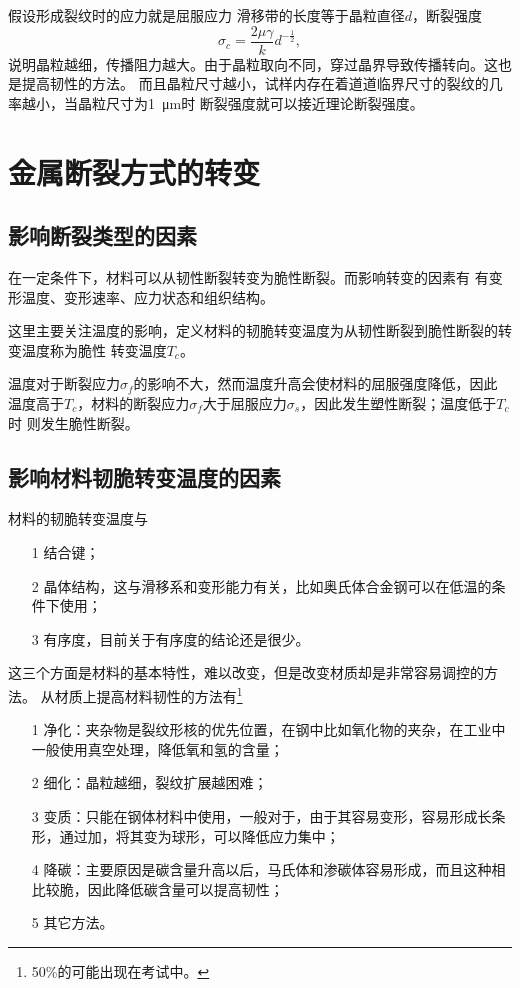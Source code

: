            假设形成裂纹时的应力就是屈服应力 滑移带的长度等于晶粒直径$d$，断裂强度
            \begin{equation}
                \sigma_c=\frac{2\mu\gamma}{k} d^{-\frac{1}{2}},
            \end{equation}
            说明晶粒越细，传播阻力越大。由于晶粒取向不同，穿过晶界导致传播转向。这也是提高韧性的方法。
            而且晶粒尺寸越小，试样内存在着道道临界尺寸的裂纹的几率越小，当晶粒尺寸为\SI{1}{\micro\m}时
            断裂强度就可以接近理论断裂强度。
    \section{金属断裂方式的转变}
        \subsection{影响断裂类型的因素}
            在一定条件下，材料可以从韧性断裂转变为脆性断裂。而影响转变的因素有
            有变形温度、变形速率、应力状态和组织结构。

            这里主要关注温度的影响，定义材料的韧脆转变温度为从韧性断裂到脆性断裂的转变温度称为脆性
            转变温度$T_c$。
            
            温度对于断裂应力$\sigma_f$的影响不大，然而温度升高会使材料的屈服强度降低，因此
            温度高于$T_c$，材料的断裂应力$\sigma_f$大于屈服应力$\sigma_s$，因此发生塑性断裂；温度低于$T_c$时
            则发生脆性断裂。
            
        \subsection{影响材料韧脆转变温度的因素}
            材料的韧脆转变温度与
            \begin{itemize}
                \item[1] 结合键；
                \item[2] 晶体结构，这与滑移系和变形能力有关，比如奥氏体合金钢可以在低温的条件下使用；
                \item[3] 有序度，目前关于有序度的结论还是很少。
            \end{itemize}
            这三个方面是材料的基本特性，难以改变，但是改变材质却是非常容易调控的方法。
            从材质上提高材料韧性的方法有\footnote{50\%的可能出现在考试中。}
            \begin{itemize}
                \item[1] 净化：夹杂物是裂纹形核的优先位置，在钢中比如氧化物的夹杂，在工业中一般使用真空处理，降低氧和氢的含量；
                \item[2] 细化：晶粒越细，裂纹扩展越困难；
                \item[3] 变质：只能在钢体材料中使用，一般对于，由于其容易变形，容易形成长条形，通过加，将其变为球形，可以降低应力集中；
                \item[4] 降碳：主要原因是碳含量升高以后，马氏体和渗碳体容易形成，而且这种相比较脆，因此降低碳含量可以提高韧性；
                \item[5] 其它方法。
            \end{itemize}
